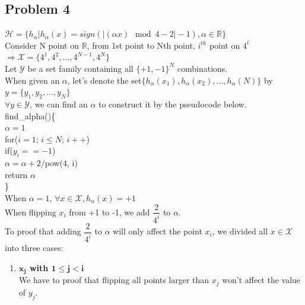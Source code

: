 \documentclass[12pt, a4paper]{article}
\newcommand\tab[1][1cm]{\hspace*{#1}}
\begin{document}
\begin{CJK}{UTF8}{bkai}
	\section*{Problem 4}
		$\mathcal{H}=\{h_\alpha|h_\alpha(x)=sign(|(\alpha x)\mod4-2|-1),\alpha \in \mathbb{R}\}$\\
		Consider N point on $\mathbb{R}$, from 1st point to Nth point, $i^{th}$ point on $4^{i}$ \\
		$\Rightarrow \mathcal{X} = \{4^1, 4^2, ..., 4^{N-1}, 4^N\}$ \\
		Let $\mathcal{Y}$ be a set family containing all $\{+1,-1\}^N$ combinations.\\
		When given an $\alpha$, let's denote the set$\{h_\alpha(x_1), h_\alpha(x_2), ..., h_\alpha(N)\}$ by $y = \{y_1, y_2, ..., y_N\}$\\
		$\forall y \in \mathcal{Y}$, we can find an $\alpha$ to construct it by the pseudocode below.\\
		find\_alpha()\{\\
		\tab $\alpha = 1$ \\
		\tab for($i = 1$; $i \leq N$; $i++$)\\
		\tab \tab if($y_i == -1$)\\
		\tab \tab \tab $\alpha = \alpha + 2 /$pow(4, i)\\
		\tab return $\alpha$\\
		\}\\
		When $\alpha = 1$, $\forall x \in \mathcal{X}, h_\alpha(x) = +1$\\
		When flipping $x_i$ from +1 to -1, we add $\dfrac{2}{4^i}$ to $\alpha$.\\
		To proof that adding $\dfrac{2}{4^i}$ to $\alpha$ will only affect the point $x_i$, we divided all $x\in\mathcal{X}$ into three cases:
		\begin{enumerate}
		\item {\bf $\bm{x_j}$ with $\bm{1\leq j < i}$}\\
			We have to proof that flipping all points larger than $x_j$ won't affect the value of $y_j$. \\

\end{enumerate}
\end{CJK}
\end{document}
